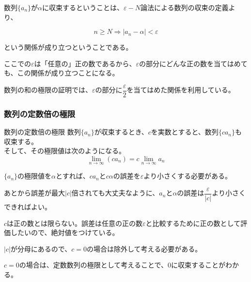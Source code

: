 \documentclass[../../math-imaging]{subfiles}
\begin{document}
数列$\{a_n\}$が$\alpha$に収束するということは、$\varepsilon-N$論法による数列の収束の定義より、

\begin{equation}
  n \geq N \Longrightarrow |a_n - \alpha| < \varepsilon
\end{equation}

という関係が成り立つということである。

ここでの$\varepsilon$は「任意の」正の数であるから、$\varepsilon$の部分にどんな正の数を当てはめても、この関係が成り立つことになる。

数列の和の極限の証明では、$\varepsilon$の部分に$\dfrac{\varepsilon}{2}$を当てはめた関係を利用している。

\subsubsection{数列の定数倍の極限}

\begin{theorem}{数列の定数倍の極限}
  \newline
  数列$\{a_n\}$が収束するとき、$c$を実数とすると、数列$\{ca_n\}$も収束する。\\
  そして、その極限値は次のようになる。
  \LARGE
  \begin{equation}
    \lim_{n \to \infty} (ca_n) = c\lim_{n \to \infty} a_n
  \end{equation}
\end{theorem}

$\{a_n\}$の極限値を$\alpha$とすれば、$ca_n$と$c\alpha$の誤差を$\varepsilon$より小さくする必要がある。

あとから誤差が最大$|c|$倍されても大丈夫なように、$a_n$と$\alpha$の誤差は$\dfrac{\varepsilon}{|c|}$より小さくできればよい。

\begin{supplnote}
  $c$は正の数とは限らない。誤差は任意の正の数$\varepsilon$と比較するために正の数として評価したいので、絶対値をつけている。
\end{supplnote}

$|c|$が分母にあるので、$c=0$の場合は除外して考える必要がある。

$c=0$の場合は、定数数列の極限として考えることで、$0$に収束することがわかる。
\end{document}
